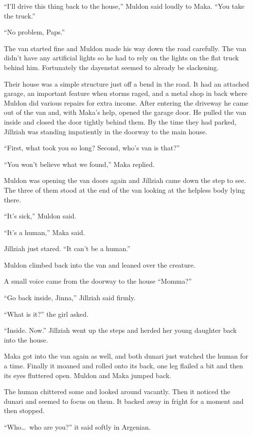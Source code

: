 ``I'll drive this thing back to the house,'' Muldon said loudly to Maka. ``You take the truck.''

``No problem, Paps.''

The van started fine and Muldon made his way down the road carefully. The van didn't have any
artificial lights so he had to rely on the lights on the flat truck behind him. Fortunately the
dayenstat seemed to already be slackening.

Their house was a simple structure just off a bend in the road. It had an attached garage, an
important feature when storms raged, and a metal shop in back where Muldon did various repairs
for extra income. After entering the driveway he came out of the van and, with Maka's help,
opened the garage door. He pulled the van inside and closed the door tightly behind them. By the
time they had parked, Jillziah was standing impatiently in the doorway to the main house.

``First, what took you so long? Second, who's van is that?''

``You won't believe what we found,'' Maka replied.

Muldon was opening the van doors again and Jillziah came down the step to see. The three of them
stood at the end of the van looking at the helpless body lying there.

``It's sick,'' Muldon said.

``It's a human,'' Maka said.

Jillziah just stared. ``It can't be a human.''

Muldon climbed back into the van and leaned over the creature.

A small voice came from the doorway to the house ``Momma?''

``Go back inside, Jinna,'' Jillziah said firmly.

``What is it?'' the girl asked.

``Inside. Now.'' Jillziah went up the steps and herded her young daughter back into the house.

Maka got into the van again as well, and both dunari just watched the human for a time. Finally
it moaned and rolled onto its back, one leg flailed a bit and then its eyes fluttered open.
Muldon and Maka jumped back.

The human chittered some and looked around vacantly. Then it noticed the dunari and seemed to
focus on them. It backed away in fright for a moment and then stopped.

``Who\ldots\ who are you?'' it said softly in Argenian.

